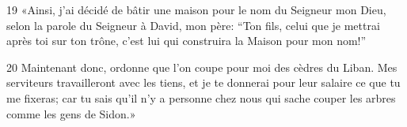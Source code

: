 
19 «Ainsi, j’ai décidé de bâtir une maison pour le nom du Seigneur mon Dieu, selon la parole du Seigneur à David, mon père: “Ton fils, celui que je mettrai après toi sur ton trône, c’est lui qui construira la Maison pour mon nom!”

20 Maintenant donc, ordonne que l’on coupe pour moi des cèdres du Liban. Mes serviteurs travailleront avec les tiens, et je te donnerai pour leur salaire ce que tu me fixeras; car tu sais qu’il n’y a personne chez nous qui sache couper les arbres comme les gens de Sidon.»
